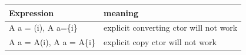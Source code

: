 \documentclass[a4paper,11pt,twoside]{book}
\newcommand{\tophline}{\hline }
\newcommand{\bottomhline}{\\ \hline }
\newcommand{\tophline}{ }
\newcommand{\bottomhline}{ }
\begin{document}
\begin{itemize}
\begin{tabular}{|p{}|p{}|}
	\tophline
	Expression & meaning \\
	\tophline
	A a = (i), A a=\{i\} & explicit converting ctor will not work \\
	\tophline
	A a = A(i), A a = A\{i\} & explicit copy ctor will not work 
	\bottomhline
\end{tabular}




\end{itemize}
\end{document}
